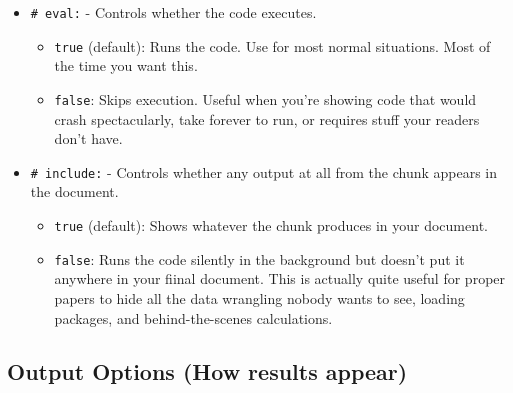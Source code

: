 \documentclass[
  letterpaper,
]{book}
\begin{document}
\begin{itemize}
\item
  \texttt{\#\textbar{}\ eval:} - Controls whether the code executes.

  \begin{itemize}
  \item
    \texttt{true} (default): Runs the code. Use for most normal
    situations. Most of the time you want this.
  \item
    \texttt{false}: Skips execution. Useful when you're showing code
    that would crash spectacularly, take forever to run, or requires
    stuff your readers don't have.
  \end{itemize}
\item
  \texttt{\#\textbar{}\ include:} - Controls whether any output at all
  from the chunk appears in the document.

  \begin{itemize}
  \item
    \texttt{true} (default): Shows whatever the chunk produces in your
    document.
  \item
    \texttt{false}: Runs the code silently in the background but doesn't
    put it anywhere in your fiinal document. This is actually quite
    useful for proper papers to hide all the data wrangling nobody wants
    to see, loading packages, and behind-the-scenes calculations.
  \end{itemize}
\end{itemize}

\subsection{Output Options (How results
appear)}\label{output-options-how-results-appear}
\end{document}
